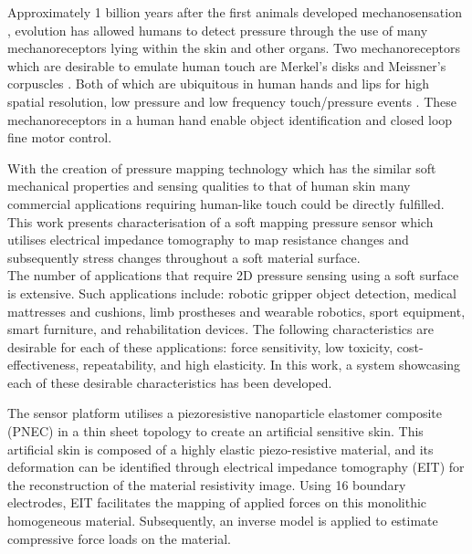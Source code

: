 Approximately 1 billion years after the first animals developed mechanosensation \citep{Parfrey2011}, evolution has allowed humans to detect pressure through the use of many mechanoreceptors lying within the skin and other organs. Two mechanoreceptors which are desirable to emulate human touch are Merkel's disks and Meissner's corpuscles \citep{Kamkim2008}. Both of which are ubiquitous in human hands and lips for high spatial resolution, low pressure and low frequency touch/pressure events \citep{Molnar2015}. These mechanoreceptors in a human hand enable object identification and closed loop fine motor control. 

With the creation of pressure mapping technology which has the similar soft mechanical properties and sensing qualities to that of human skin many commercial applications requiring human-like touch could be directly fulfilled. This work presents characterisation of a soft mapping pressure sensor which utilises electrical impedance tomography to map resistance changes and subsequently stress changes throughout a soft material surface. 
\\

The number of applications that require 2D pressure sensing using a soft surface is extensive. Such applications include: robotic gripper object detection, medical mattresses and cushions, limb prostheses and wearable robotics, sport equipment, smart furniture, and rehabilitation devices. The following characteristics are desirable for each of these applications: force sensitivity, low toxicity, cost-effectiveness, repeatability, and high elasticity. In this work, a system showcasing each of these desirable characteristics has been developed. 


The sensor platform utilises a piezoresistive nanoparticle elastomer composite (PNEC) in a thin sheet topology to create an artificial sensitive skin. This artificial skin is composed of a highly elastic piezo-resistive material, and its deformation can be identified through electrical impedance tomography (EIT) for the reconstruction of the material resistivity image. Using 16 boundary electrodes, EIT facilitates the mapping of applied forces on this monolithic homogeneous material. Subsequently, an inverse model is applied to estimate compressive force loads on the material.
\\

